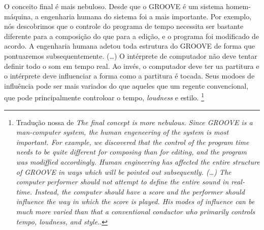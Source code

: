 \begin{citacao} 
O conceito final é mais nebuloso. Desde que o GROOVE é um sistema homem-máquina, a engenharia humana do sistema foi a mais importante. Por exemplo, nós descobrimos que o controle do programa de tempo necessita ser bastante diferente para a composição do que para a edição, e o programa foi modificado de acordo. A engenharia humana adetou toda estrutura do GROOVE de forma que pontuaremos subsequentemente. (\ldots) O intérprete de computador não deve tentar definir todo o som em tempo real. Ao invés, o computador deve ter ua partitura e o intérprete deve influenciar a forma como a partitura é tocada. Seus modoes de influência pode ser mais variados do que aqueles que um regente convencional, que pode principalmente controloar o tempo, \emph{loudness} e estilo.\cite[p.~715-716]{mathews_groove_1970}
\footnote{Tradução nossa de \emph{The final concept is more nebulous. Since GROOVE is a man-computer system, the human engeneering of the system is most important. For example, we discovered that the control of the program time needs to be quite different for composing than for editing, and the program was modiffied accordingly. Human engineering has affected the entire structure of GROOVE in ways which will be pointed out subsequently. (\ldots) The computer performer should not attempt to define the entire sound in real-time. Instead, the computer should have a score and the performer should influence the way in which the score is played. His modes of influence can be much more varied than that a conventional conductor who primarily controls tempo, loudness, and style.}.}
\end{citacao}

